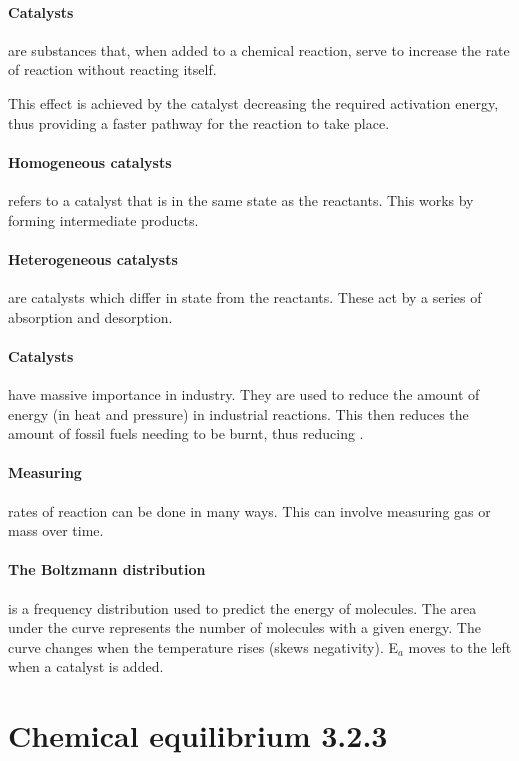 	\paragraph{Catalysts} are substances that, when added to a chemical reaction, serve to increase the rate of reaction without reacting itself.
	
	This effect is achieved by the catalyst decreasing the required activation energy, thus providing a faster pathway for the reaction to take place.
	
	\paragraph{Homogeneous catalysts} refers to a catalyst that is in the same state as the reactants.
	This works by forming intermediate products.
	
	\paragraph{Heterogeneous catalysts} are catalysts which differ in state from the reactants.
	These act by a series of absorption and desorption.
	
	\paragraph{Catalysts} have massive importance in industry.
	They are used to reduce the amount of energy (in heat and pressure) in industrial reactions.
	This then reduces the amount of fossil fuels needing to be burnt, thus reducing .
	
	\paragraph{Measuring} rates of reaction can be done in many ways. This can involve measuring gas or mass over time.
	
	\paragraph{The Boltzmann distribution} is a frequency distribution used to predict the energy of molecules.
	The area under the curve represents the number of molecules with a given energy.
	The curve changes when the temperature rises (skews negativity). E$_a$ moves to the left when a catalyst is added.
	
\section{Chemical equilibrium 3.2.3}

